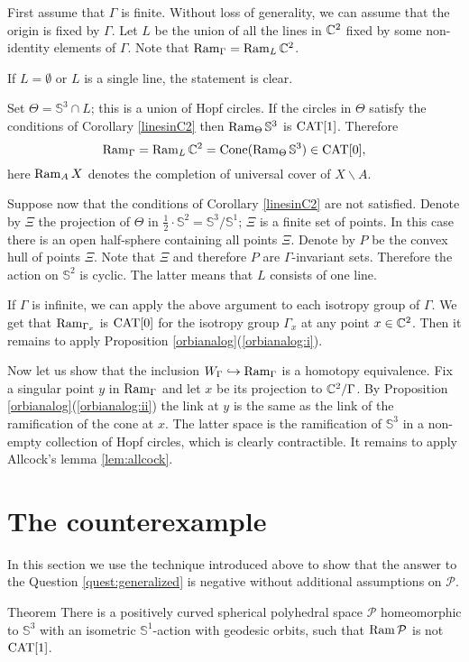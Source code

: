 \documentclass[oneside,a4paper]{article}
\def\Ram{\mathop{\rm Ram}\nolimits}
\def\Cone{\mathop{\rm Cone}\nolimits}
\def\SS{\mathbb{S}}
\begin{document}
First assume that $\Gamma$ is finite.
Without loss of generality, we can assume that the origin is fixed by $\Gamma$.
Let $L$ be the union of all the lines in $\mathbb{C}^2$
fixed by some non-identity elements of $\Gamma$.
Note that $\Ram_{\Gamma}=\Ram_{L}\CC^2$.

If $L=\emptyset$
or $L$ is a single line,
the statement is clear.

Set $\Theta=\SS^3\cap L$; this
is a union of Hopf circles.
If the circles in $\Theta$
satisfy the conditions of
Corollary \ref{linesinC2} then $\Ram_{\Theta} \SS^3$ is $\mathrm{CAT}[1]$.
Therefore
\[\Ram_\Gamma=\Ram_L\CC^2=\Cone(\Ram_{\Theta} \SS^3)\in \CAT[0],\]
here $\Ram_AX$ denotes the completion of universal cover of $X\backslash A$.

Suppose now that the conditions of
Corollary \ref{linesinC2} are not satisfied.
Denote by $\Xi$ the projection of $\Theta$ in $\tfrac12\cdot\SS^2=\SS^3/\SS^1$;
$\Xi$ is a finite set of points.
In this case there is an open half-sphere containing all points $\Xi$.
Denote by $P$ be the convex hull of points $\Xi$.
Note that $\Xi$ and therefore $P$ are $\Gamma$-invariant sets.
Therefore the action on $\SS^2$ is cyclic.
The latter means that $L$ consists of one line.

If $\Gamma$ is infinite, we can apply the above argument to each isotropy group
of $\Gamma$.
We get that $\Ram_{\Gamma_x}$ is $\mathrm{CAT}[0]$
for the isotropy group $\Gamma_x$ at any point $x\in\mathbb{C}^2$.
Then it remains to apply Proposition \ref{orbianalog}(\ref{orbianalog:i}).

Now let us show that the inclusion $W_\Gamma\hookrightarrow \Ram_\Gamma$ is a homotopy equivalence.
Fix a singular point $y$ in $\Ram_\Gamma$
and let $x$ be its projection to $\mathbb{C}^2/\Gamma$.
By Proposition \ref{orbianalog}(\ref{orbianalog:ii})
the link at $y$ is the same as the link of the ramification of the cone at $x$.
The latter space is the ramification of $\SS^3$ in a non-empty collection of Hopf circles,
which is clearly contractible.
It remains to apply Allcock's lemma \ref{lem:allcock}.
\qeds

\section{The counterexample}

In this section we use the technique introduced above to show that
the answer to the Question \ref{quest:generalized} is negative
without additional assumptions on $\mathcal{P}$.

\begin{thm}{Theorem}\label{notCAT[1]} There is a positively curved spherical polyhedral space $\mathcal{P}$ homeomorphic to $\SS^3$
with an isometric $\SS^1$-action
with geodesic orbits,
such that $\Ram \mathcal{P}$ is not $\mathrm{CAT}[1]$.
\end{thm}
\end{document}
